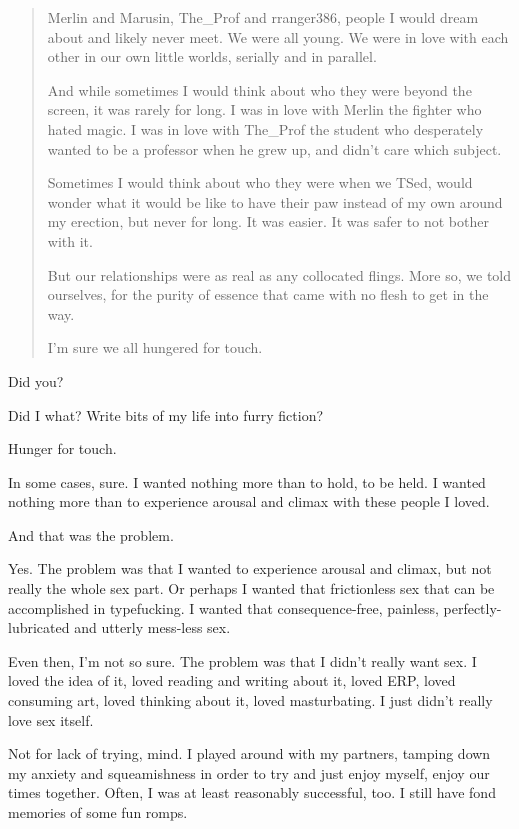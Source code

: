 \begin{paracol}{2}
\begin{leftcolumn}
\begin{quotation}
  Merlin and Marusin, The\_Prof and rranger386, people I would dream about and likely never meet. We were all young. We were in love with each other in our own little worlds, serially and in parallel.

  And while sometimes I would think about who they were beyond the screen, it was rarely for long. I was in love with Merlin the fighter who hated magic. I was in love with The\_Prof the student who desperately wanted to be a professor when he grew up, and didn’t care which subject.

  Sometimes I would think about who they were when we TSed, would wonder what it would be like to have their paw instead of my own around my erection, but never for long. It was easier. It was safer to not bother with it.

  But our relationships were as real as any collocated flings. More so, we told ourselves, for the purity of essence that came with no flesh to get in the way.

  I’m sure we all hungered for touch.
\end{quotation}

\begin{ally}
Did you?
\end{ally}
Did I what? Write bits of my life into furry fiction?

\begin{ally}
Hunger for touch.
\end{ally}
In some cases, sure. I wanted nothing more than to hold, to be held. I wanted nothing more than to experience arousal and climax with these people I loved.

\begin{ally}
And that was the problem.
\end{ally}
Yes. The problem was that I wanted to experience arousal and climax, but not really the whole sex part. Or perhaps I wanted that frictionless sex that can be accomplished in typefucking. I wanted that consequence-free, painless, perfectly-lubricated and utterly mess-less sex.

Even then, I'm not so sure.
\newpage
{}
\noindent The problem was that I didn't really want sex. I loved the idea of it, loved reading and writing about it, loved ERP, loved consuming art, loved thinking about it, loved masturbating. I just didn't really love sex itself.

Not for lack of trying, mind. I played around with my partners, tamping down my anxiety and squeamishness in order to try and just enjoy myself, enjoy our times together. Often, I was at least reasonably successful, too. I still have fond memories of some fun romps.


\end{leftcolumn}
\end{paracol}
